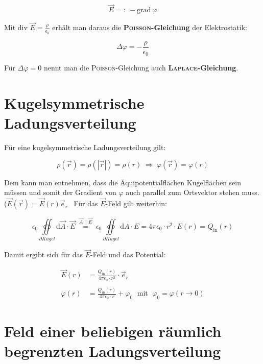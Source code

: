 \begin{equation*}
\vec{E} =: \ -\text{grad} \ \varphi
\end{equation*}

Mit div $\vec{E} = \frac{\rho}{\epsilon_0}$ erhält man daraus die \textbf{\textsc{Poisson}-Gleichung} der Elektrostatik:

\begin{equation*}
\Delta\varphi = - \frac{\rho}{\epsilon_0}
\end{equation*}

Für $\Delta\varphi = 0$ nennt man die \textsc{Poisson}-Gleichung auch \textbf{\textsc{Laplace}-Gleichung}.

\section{Kugelsymmetrische Ladungsverteilung}

Für eine kugelsymmetrische Ladungsverteilung gilt:

\begin{equation*}
\rho(\vec{r}) = \rho(|\vec{r}|) = \rho(r) \; \Rightarrow \; \varphi(\vec{r}) = \varphi(r)
\end{equation*}

Dem kann man entnehmen, dass die Äquipotentialflächen Kugelflächen sein müssen und somit der Gradient von $\varphi$ auch parallel zum Ortsvektor stehen muss.($\vec{E}(\vec{r}) = \vec{E}(r)\vec{e}_r$ \
Für das $\vec{E}$-Feld gilt weiterhin:

\begin{equation*}
\epsilon_0\oiint\limits_{\partial Kugel}\mathrm{d}\vec{A}\cdot\vec{E} \; \overset{\vec{A}\parallel\vec{E}}{=} \; \epsilon_0\oiint\limits_{\partial Kugel}\mathrm{d} A \cdot E = 4\pi\epsilon_0\cdot r^2 \cdot E(r) = Q_{\mathrm{in}}(r)
\end{equation*}

Damit ergibt sich für das $\vec{E}$-Feld und das Potential:

\begin{align*}
\vec{E}(r) &= \frac{Q_{\mathrm{in}}(r)}{4\pi\epsilon_0\cdot r^2} \cdot \vec{e}_r\\
\ \\
\varphi(r) &= \frac{Q_{\mathrm{in}}(r)}{4\pi\epsilon_0\cdot r} + \varphi_0 \; \text{ mit } \; \varphi_0 = \varphi(r \rightarrow 0)
\end{align*}

\section{Feld einer beliebigen räumlich begrenzten Ladungsverteilung}

